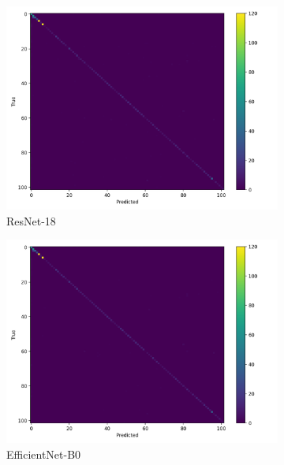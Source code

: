 \documentclass[11pt]{article}
\begin{document}
\begin{figure}[H]
  \vspace{0.5em}

  \begin{subfigure}[t]{0.32\textwidth}
    \includegraphics[width=\linewidth]{results/resnet18_224_sgd_cosine_ls01/confusion_matrix.png}
    \caption{ResNet-18}\label{fig:cms-resnet}
  \end{subfigure}\hfill
  \begin{subfigure}[t]{0.32\textwidth}
    \includegraphics[width=\linewidth]{results/effb0_224_adam_cosine_ls05/confusion_matrix.png}
    \caption{EfficientNet-B0}\label{fig:cms-effb0}
  \end{subfigure}\hfill
  \begin{subfigure}[t]{0.32\textwidth}

\end{subfigure}
\end{figure}
\end{document}

